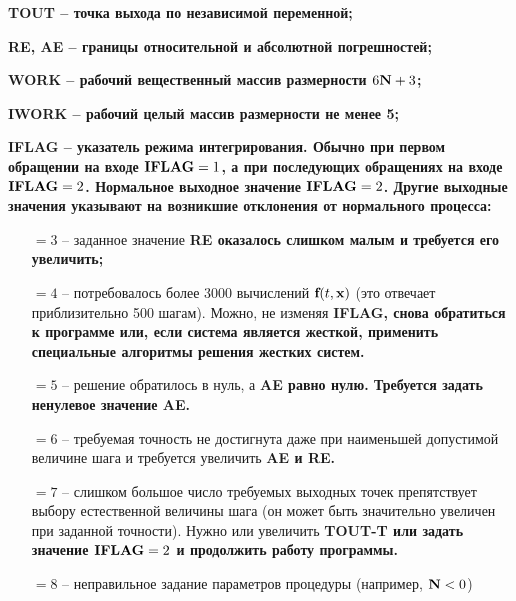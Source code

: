 \bf{TOUT} -- точка выхода по независимой переменной;

\bf{RE, AE} -- границы относительной и абсолютной погрешностей;

\bf{WORK} -- рабочий вещественный массив размерности $6\bf{N} + 3$;

\bf{IWORK} -- рабочий целый массив размерности не менее 5;

\bf{IFLAG} -- указатель режима интегрирования. Обычно при первом обращении на входе $\bf{IFLAG} = 1$, а при последующих
обращениях на входе $\bf{IFLAG} = 2$. Нормальное выходное значение $\bf{IFLAG} = 2$. Другие выходные значения указывают
на возникшие отклонения от нормального процесса:
\begin{enumerate}
    \item[$=3$ --] заданное значение \bf{RE} оказалось слишком малым и требуется его увеличить;
    \item[$=4$ --] потребовалось более 3000 вычислений $\bf{f}(t, \bf{x})$ (это отвечает приблизительно 500 шагам).
    Можно, не изменяя \bf{IFLAG}, снова обратиться к программе или, если система является жесткой, применить специальные
    алгоритмы решения жестких систем.
    \item[$=5$ --] решение обратилось в нуль, а \bf{AE} равно нулю. Требуется задать ненулевое значение \bf{AE}.
    \item[$=6$ --] требуемая точность не достигнута даже при наименьшей допустимой величине шага и требуется увеличить
    \bf{AE} и \bf{RE}.
    \item[$=7$ --] слишком большое число требуемых выходных точек препятствует выбору естественной величины шага (он
    может быть значительно увеличен при заданной точности). Нужно или увеличить \bf{TOUT-T} или задать значение
    $\bf{IFLAG} = 2$ и продолжить работу программы.
    \item[$=8$ --] неправильное задание параметров процедуры (например, $\bf{N} < 0$)
\end{enumerate}
